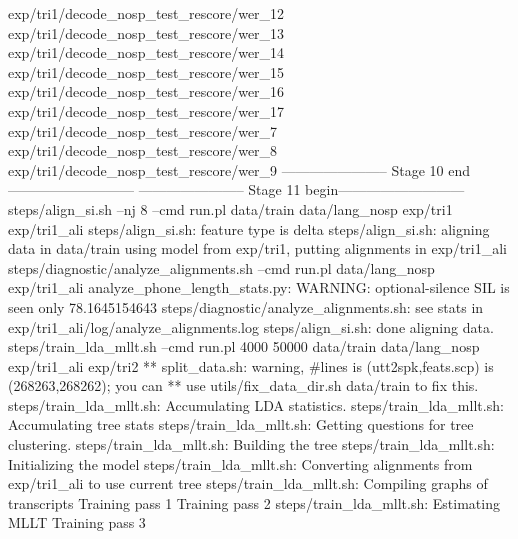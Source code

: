 exp/tri1/decode_nosp_test_rescore/wer_12
exp/tri1/decode_nosp_test_rescore/wer_13
exp/tri1/decode_nosp_test_rescore/wer_14
exp/tri1/decode_nosp_test_rescore/wer_15
exp/tri1/decode_nosp_test_rescore/wer_16
exp/tri1/decode_nosp_test_rescore/wer_17
exp/tri1/decode_nosp_test_rescore/wer_7
exp/tri1/decode_nosp_test_rescore/wer_8
exp/tri1/decode_nosp_test_rescore/wer_9
----------------------- Stage 10 end---------------------------
----------------------- Stage 11 begin---------------------------
steps/align_si.sh --nj 8 --cmd run.pl data/train data/lang_nosp exp/tri1 exp/tri1_ali
steps/align_si.sh: feature type is delta
steps/align_si.sh: aligning data in data/train using model from exp/tri1, putting alignments in exp/tri1_ali
steps/diagnostic/analyze_alignments.sh --cmd run.pl data/lang_nosp exp/tri1_ali
analyze_phone_length_stats.py: WARNING: optional-silence SIL is seen only 78.1645154643%
steps/diagnostic/analyze_alignments.sh: see stats in exp/tri1_ali/log/analyze_alignments.log
steps/align_si.sh: done aligning data.
steps/train_lda_mllt.sh --cmd run.pl 4000 50000 data/train data/lang_nosp exp/tri1_ali exp/tri2
** split_data.sh: warning, #lines is (utt2spk,feats.scp) is (268263,268262); you can 
**  use utils/fix_data_dir.sh data/train to fix this.
steps/train_lda_mllt.sh: Accumulating LDA statistics.
steps/train_lda_mllt.sh: Accumulating tree stats
steps/train_lda_mllt.sh: Getting questions for tree clustering.
steps/train_lda_mllt.sh: Building the tree
steps/train_lda_mllt.sh: Initializing the model
steps/train_lda_mllt.sh: Converting alignments from exp/tri1_ali to use current tree
steps/train_lda_mllt.sh: Compiling graphs of transcripts
Training pass 1
Training pass 2
steps/train_lda_mllt.sh: Estimating MLLT
Training pass 3
